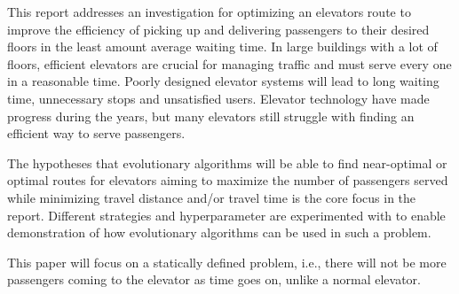 This report addresses an investigation for optimizing an elevators route to improve the efficiency of picking up and delivering passengers to their desired floors in the least amount average waiting time.
In large buildings with a lot of floors, efficient elevators are crucial for managing traffic and must serve every one in a reasonable time.
Poorly designed elevator systems will lead to long waiting time, unnecessary stops and unsatisfied users.
Elevator technology have made progress during the years, but many elevators still struggle with finding an efficient way
to serve passengers.

The hypotheses that evolutionary algorithms will be able to find near-optimal or optimal routes for elevators
aiming to maximize the number of passengers served while minimizing travel distance and/or travel time is
the core focus in the report. Different strategies and hyperparameter are experimented with to enable
demonstration of how evolutionary algorithms can be used in such a problem.

This paper will focus on a statically defined problem, i.e., there will not be more passengers coming to the elevator as time goes on, unlike a normal elevator.
